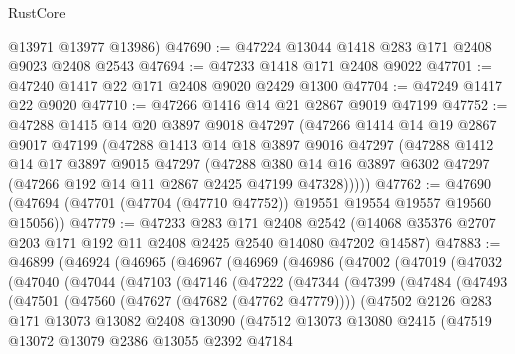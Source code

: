 \begin{lexlean}{RustCore}
\begin{coremodule}
      @13971
      @13977
      @13986)
@47690 := @47224 @13044 @1418 @283 @171 @2408 @9023 @2408 @2543
@47694 := @47233 @1418 @171 @2408 @9022
@47701 := @47240 @1417 @22 @171 @2408 @9020 @2429 @1300
@47704 := @47249 @1417 @22 @9020
@47710 := @47266 @1416 @14 @21 @2867 @9019 @47199
@47752 := @47288
    @1415
    @14
    @20
    @3897
    @9018
    @47297
    (@47266
      @1414
      @14
      @19
      @2867
      @9017
      @47199
      (@47288
        @1413
        @14
        @18
        @3897
        @9016
        @47297
        (@47288
          @1412
          @14
          @17
          @3897
          @9015
          @47297
          (@47288
            @380
            @14
            @16
            @3897
            @6302
            @47297
            (@47266 @192 @14 @11 @2867 @2425 @47199 @47328)))))
@47762 := @47690 (@47694 (@47701 (@47704 (@47710 @47752)) @19551 @19554 @19557 @19560 @15056))
@47779 := @47233
    @283
    @171
    @2408
    @2542
    (@14068 @35376 @2707 @203 @171 @192 @11 @2408 @2425 @2540 @14080 @47202 @14587)
@47883 := @46899
    (@46924
      (@46965
        (@46967
          (@46969
            (@46986
              (@47002
                (@47019
                  (@47032
                    (@47040
                      (@47044
                        (@47103
                          (@47146
                            (@47222
                              (@47344
                                (@47399
                                  (@47484
                                    (@47493
                                      (@47501
                                        (@47560 (@47627 (@47682 (@47762 @47779))))
                                        (@47502
                                          @2126
                                          @283
                                          @171
                                          @13073
                                          @13082
                                          @2408
                                          @13090
                                          (@47512
                                            @13073
                                            @13080
                                            @2415
                                            (@47519
                                              @13072
                                              @13079
                                              @2386
                                              @13055
                                              @2392
                                              @47184

\end{coremodule}
\end{lexlean}
